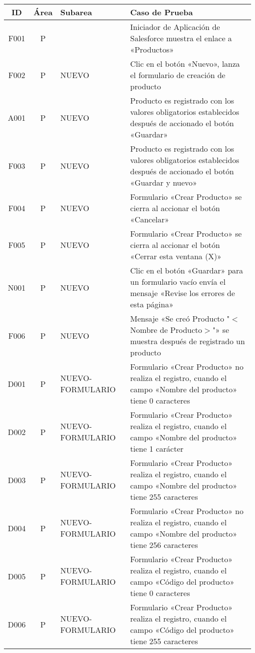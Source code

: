\begin{landscape}
\centering
\small
{\def\arraystretch{2}
\begin{longtable}[htb]{|c|c|p{5.0cm}|p{14.0cm}|}
\hline
\textbf{ID} & \textbf{Área} & \textbf{Subarea} & \textbf{Caso de Prueba} \\
\hline
F001 & P &  & Iniciador de Aplicación de Salesforce muestra el enlace a «Productos» \\ \hline
F002 & P & NUEVO & Clic en el botón «Nuevo», lanza el formulario de creación de producto \\ \hline
A001 & P & NUEVO & Producto es registrado con los valores obligatorios establecidos después de accionado el botón «Guardar» \\ \hline
F003 & P & NUEVO & Producto es registrado con los valores obligatorios establecidos después de accionado el botón «Guardar y nuevo» \\ \hline
F004 & P & NUEVO & Formulario «Crear Producto» se cierra al accionar el botón «Cancelar» \\ \hline
F005 & P & NUEVO & Formulario «Crear Producto» se cierra al accionar el botón «Cerrar esta ventana (X)» \\ \hline
N001 & P & NUEVO & Clic en el botón «Guardar» para un formulario vacío envía el mensaje «Revise los errores de esta página» \\ \hline
F006 & P & NUEVO & Mensaje «Se creó Producto "$<$Nombre de Producto$>$"» se muestra después de registrado un producto \\ \hline
D001 & P & NUEVO-FORMULARIO & Formulario «Crear Producto» no realiza el registro, cuando el campo «Nombre del producto» tiene 0 caracteres \\ \hline
D002 & P & NUEVO-FORMULARIO & Formulario «Crear Producto» realiza el registro, cuando el campo «Nombre del producto» tiene 1 carácter \\ \hline
D003 & P & NUEVO-FORMULARIO & Formulario «Crear Producto» realiza el registro, cuando el campo «Nombre del producto» tiene 255 caracteres \\ \hline
D004 & P & NUEVO-FORMULARIO & Formulario «Crear Producto» no realiza el registro, cuando el campo «Nombre del producto» tiene 256 caracteres \\ \hline
D005 & P & NUEVO-FORMULARIO & Formulario «Crear Producto» realiza el registro, cuando el campo «Código del producto» tiene 0 caracteres \\ \hline
D006 & P & NUEVO-FORMULARIO & Formulario «Crear Producto» realiza el registro, cuando el campo «Código del producto» tiene 255 caracteres \\ \hline

\end{longtable}}
\end{landscape}
